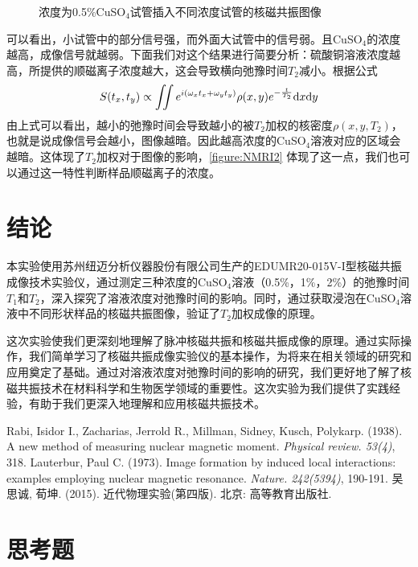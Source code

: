 \documentclass[font=default]{mpltx}
\begin{document}
\begin{figure}[]
{\begin{minipage}[b]{0.31\linewidth}
    \end{minipage}
  }
  \caption{浓度为0.5\%CuSO$_4$试管插入不同浓度试管的核磁共振图像}
  \label{figure:NMRI2} 
\end{figure}
可以看出，小试管中的部分信号强，而外面大试管中的信号弱。且CuSO$_4$的浓度越高，成像信号就越弱。下面我们对这个结果进行简要分析：硫酸铜溶液浓度越高，所提供的顺磁离子浓度越大，这会导致横向弛豫时间$T_2$减小。根据公式
	\begin{equation}
		S(t_x,t_y)\propto\iint e^{i(\omega_x t_x+\omega_y t_y)}\rho(x,y)e^{-\frac{t}{T_2}} {\rm d}x{\rm d}y
	\end{equation}
由上式可以看出，越小的弛豫时间会导致越小的被$T_2$加权的核密度$\rho(x,y,T_2)$，也就是说成像信号会越小，图像越暗。因此越高浓度的CuSO$_4$溶液对应的区域会越暗。这体现了$T_2$加权对于图像的影响，\autoref{figure:NMRI2} 体现了这一点，我们也可以通过这一特性判断样品顺磁离子的浓度。
\section{结论}
本实验使用苏州纽迈分析仪器股份有限公司生产的EDUMR20-015V-I型核磁共振成像技术实验仪，通过测定三种浓度的CuSO$_4$溶液（0.5\%，1\%，2\%）的弛豫时间$T_1$和$T_2$，深入探究了溶液浓度对弛豫时间的影响。同时，通过获取浸泡在CuSO$_4$溶液中不同形状样品的核磁共振图像，验证了$T_2$加权成像的原理。

这次实验使我们更深刻地理解了脉冲核磁共振和核磁共振成像的原理。通过实际操作，我们简单学习了核磁共振成像实验仪的基本操作，为将来在相关领域的研究和应用奠定了基础。通过对溶液浓度对弛豫时间的影响的研究，我们更好地了解了核磁共振技术在材料科学和生物医学领域的重要性。这次实验为我们提供了实践经验，有助于我们更深入地理解和应用核磁共振技术。
\begin{thebibliography}{}
   Rabi, Isidor I., Zacharias, Jerrold R., Millman, Sidney, Kusch, Polykarp. (1938). A new method of measuring nuclear magnetic moment. \textit{Physical review. 53(4)}, 318.
   Lauterbur, Paul C. (1973). Image formation by induced local interactions: examples employing nuclear magnetic resonance. \textit{Nature. 242(5394)}, 190-191.
   吴思诚, 荀坤. (2015). 近代物理实验(第四版). 北京: 高等教育出版社.
\end{thebibliography}
  
\clearpage %
\appendix %
\section{思考题}
\end{document}
